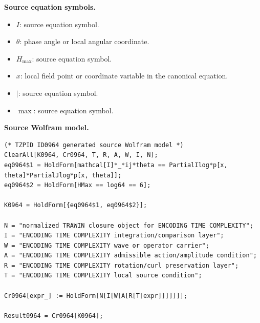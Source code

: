 \begin{minipage}[t]{0.49\linewidth}
\begingroup
\small
\raggedright
\textbf{Source equation symbols.}\par
\begin{itemize}[leftmargin=1.35em,itemsep=1pt,topsep=1pt,parsep=0pt]
    \item $I$: source equation symbol.
    \item $\theta$: phase angle or local angular coordinate.
    \item $H_{\max}$: source equation symbol.
    \item $x$: local field point or coordinate variable in the canonical equation.
    \item $\mid$: source equation symbol.
    \item $\max$: source equation symbol.
\end{itemize}
\endgroup
\end{minipage}\hfill
\begin{minipage}[t]{0.47\linewidth}
\begingroup
\scriptsize
\raggedright
\textbf{Source Wolfram model.}\par
\begin{Verbatim}[fontsize=\tiny,breaklines=true,breakanywhere=true]
(* TZPID ID0964 generated source Wolfram model *)
ClearAll[K0964, Cr0964, T, R, A, W, I, N];
eq0964$1 = HoldForm[mathcal[I]*_*ij*theta == PartialIlog*p[x, theta]*PartialJlog*p[x, theta]];
eq0964$2 = HoldForm[HMax == log64 == 6];

K0964 = HoldForm[{eq0964$1, eq0964$2}];

N = "normalized TRAWIN closure object for ENCODING TIME COMPLEXITY";
I = "ENCODING TIME COMPLEXITY integration/comparison layer";
W = "ENCODING TIME COMPLEXITY wave or operator carrier";
A = "ENCODING TIME COMPLEXITY admissible action/amplitude condition";
R = "ENCODING TIME COMPLEXITY rotation/curl preservation layer";
T = "ENCODING TIME COMPLEXITY local source condition";

Cr0964[expr_] := HoldForm[N[I[W[A[R[T[expr]]]]]]];

Result0964 = Cr0964[K0964];
\end{Verbatim}
\endgroup
\end{minipage}

